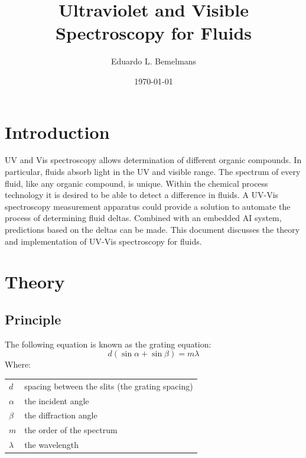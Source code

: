 \documentclass[aps,twocolumn,twoside,secnumarabic,balancelastpage,amsmath,amssymb,nofootinbib,hyperref=pdftex]{revtex4}
\makeatletter
\newenvironment{EqParameters}[1][]
  {#1 \begin{tabular}[t]{>{$}l<{$} @{${}={}$} l}}
  {\end{tabular}\\[\belowdisplayskip]}
\makeatother
\begin{document}
\title{Ultraviolet and Visible Spectroscopy for Fluids}
\author         {Eduardo L. Bemelmans}
\date{\today}


\begin{abstract}



\end{abstract}

\maketitle


\section{Introduction}
UV and Vis spectroscopy allows determination of different organic compounds. In particular, fluids absorb light in the UV and visible range. The spectrum of every fluid, like any organic compound, is unique. Within the chemical process technology it is desired to be able to detect a difference in fluids. A UV-Vis spectroscopy measurement apparatus could provide a solution to automate the process of determining fluid deltas. Combined with an embedded AI system, predictions based on the deltas can be made. This document discusses the theory and implementation of UV-Vis spectroscopy for fluids.

\section{Theory}
\subsection{Principle}

The following equation is known as the grating equation\cite{geqs}: %
\begin{equation}
   d(\sin{\alpha}+\sin{\beta})=m\lambda 
   \label{eq:gratingEquation1}
\end{equation}
Where:
\begin{EqParameters}
d    &  spacing between the slits (the grating spacing) \\
\alpha &  the incident angle \\
\beta &  the diffraction angle \\
m    &  the order of the spectrum \\
\lambda & the wavelength \\
\end{EqParameters}
\end{document}
